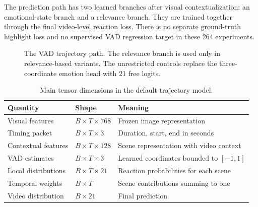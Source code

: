 \documentclass[11pt,a4paper]{article}
\begin{document}
The prediction path has two learned branches after visual contextualization: an emotional-state branch and a relevance branch. They are trained together through the final video-level reaction loss. There is no separate ground-truth highlight loss and no supervised VAD regression target in these 264 experiments.

\begin{figure}[htbp]\centering
{}
\caption{The VAD trajectory path. The relevance branch is used only in relevance-based variants. The unrestricted controls replace the three-coordinate emotion head with 21 free logits.}
\end{figure}\FloatBarrier

\begin{table}[htbp]\centering
\caption{Main tensor dimensions in the default trajectory model.}
\begin{tabularx}{\linewidth}{p{4.0cm}p{3.5cm}X}\toprule
Quantity & Shape & Meaning\\\midrule
Visual features & $B\times T\times768$ & Frozen image representation\\
Timing packet & $B\times T\times3$ & Duration, start, end in seconds\\
Contextual features & $B\times T\times128$ & Scene representation with video context\\
VAD estimates & $B\times T\times3$ & Learned coordinates bounded to $[-1,1]$\\
Local distributions & $B\times T\times21$ & Reaction probabilities for each scene\\
Temporal weights & $B\times T$ & Scene contributions summing to one\\
Video distribution & $B\times21$ & Final prediction\\\bottomrule
\end{tabularx}\end{table}
\end{document}
